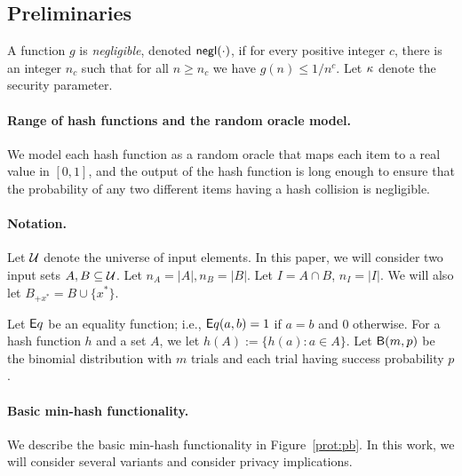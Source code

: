 \subsection{Preliminaries}
A function $g$ is  {\it negligible}, denoted $\negl(\cdot)$, if for every
positive integer $c$, there is an integer $n_c$ such that for all $n \ge n_c$ we
have $g(n) \le 1/n^c$. Let $\secparam$ denote the security parameter. 

\paragraph{Range of hash functions and the random oracle model.}
We model each hash function as a random oracle that maps each item to a real
value in $[0, 1]$, and the output of the hash function is long enough to ensure
that the probability of any two different items having a hash collision is
negligible. 

\paragraph{Notation.} 
Let $\U$ denote the universe of input elements. In this paper, we will consider two input sets $A,B \subseteq \U$.  
Let $n_A = |A|, n_B = |B|$.  Let $I = A \cap B$, $n_{I} = |I|$. 
We will also let $B_{+x^*} = B \cup \{x^*\}$.

Let ${\sf Eq}$ be an equality function; i.e., ${\sf Eq}(a, b) = 1$ if
$a=b$ and $0$ otherwise. 
For a hash function $h$ and a set $A$, we let $h(A) := \{h(a): a \in A\}.$
Let $\Bino(m,p)$ be the binomial distribution with $m$ trials and each
trial having success probability $p$. 

\paragraph{Basic min-hash functionality.} We describe the basic min-hash functionality in Figure~\ref{prot:pb}. In this work, we will consider several variants and consider privacy implications. 

